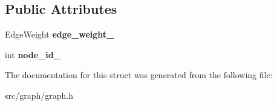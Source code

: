 \subsection*{Public Attributes}
\begin{DoxyCompactItemize}
\item 
\hypertarget{structall__distance__sketch_1_1graph_1_1EdgeDetails_a4dedcd55680897a167d92cf7ae663cf4}{}Edge\+Weight {\bfseries edge\+\_\+weight\+\_\+}\label{structall__distance__sketch_1_1graph_1_1EdgeDetails_a4dedcd55680897a167d92cf7ae663cf4}

\item 
\hypertarget{structall__distance__sketch_1_1graph_1_1EdgeDetails_afe3573d51b0139ae28c128ec333dd722}{}int {\bfseries node\+\_\+id\+\_\+}\label{structall__distance__sketch_1_1graph_1_1EdgeDetails_afe3573d51b0139ae28c128ec333dd722}

\end{DoxyCompactItemize}


The documentation for this struct was generated from the following file\+:\begin{DoxyCompactItemize}
\item 
src/graph/graph.\+h\end{DoxyCompactItemize}
